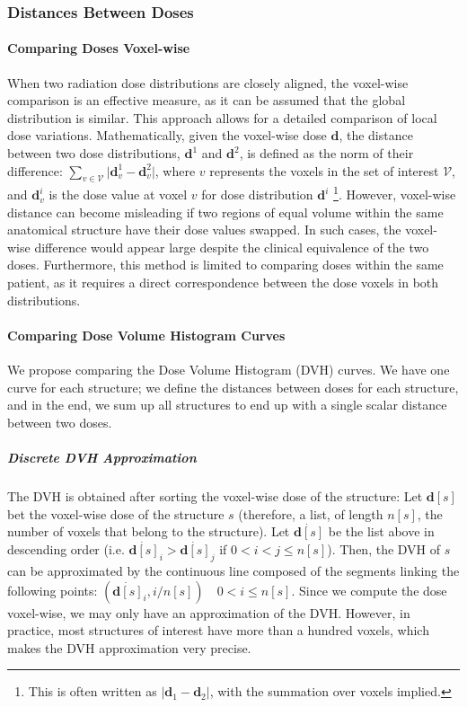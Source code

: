 \subsubsection{Distances Between Doses}
\paragraph{Comparing Doses Voxel-wise}
When two radiation dose distributions are closely aligned, the voxel-wise comparison is an effective measure, as it can be assumed that the global distribution is similar.
This approach allows for a detailed comparison of local dose variations.
Mathematically, given the voxel-wise dose $\textbf{d}$, the distance between two dose distributions, $\textbf{d}^1$ and $\textbf{d}^2$, is defined as the norm of their difference:
$\sum_{v \in \mathcal{V}} \lvert \textbf{d}^1_v - \textbf{d}^2_v \rvert$, where $v$ represents the voxels in the set of interest $\mathcal{V}$, and $\textbf{d}^i_v$ is the dose value at voxel $v$ for dose distribution $\textbf{d}^i$
\footnote{This is often written as $\lvert \textbf{d}_1 - \textbf{d}_2 \rvert$, with the summation over voxels implied.}.
However, voxel-wise distance can become misleading if two regions of equal volume within the same anatomical structure have their dose values swapped.
In such cases, the voxel-wise difference would appear large despite the clinical equivalence of the two doses.
Furthermore, this method is limited to comparing doses within the same patient, as it requires a direct correspondence between the dose voxels in both distributions.

\paragraph{Comparing Dose Volume Histogram Curves}
We propose comparing the Dose Volume Histogram (DVH) curves.
We have one curve for each structure; we define the distances between doses for each structure, and in the end, we sum up all structures to end up with a single scalar distance between two doses.

\subparagraph{Discrete DVH Approximation}
The DVH is obtained after sorting the voxel-wise dose of the structure:
Let $\textbf{d} \left[s\right]$ bet the voxel-wise dose of the structure $s$ (therefore, a list, of length $n\left[s\right]$, the number of voxels that belong to the structure).
Let $\dot{\textbf{d}\left[s\right]}$ be the list above in descending order (i.e. $\dot{\textbf{d}\left[s\right]}_i > \dot{\textbf{d}\left[s\right]}_j$ if $0 < i < j \leq n\left[s\right ]$).
Then, the DVH of $s$ can be approximated by the continuous line composed of the segments linking the following points:
$\left( \dot{\textbf{d}\left[s\right]}_i, i/n\left[s\right] \right) \quad 0 < i \leq n\left[s\right]$.
Since we compute the dose voxel-wise, we may only have an approximation of the DVH.
However, in practice, most structures of interest have more than a hundred voxels, which makes the DVH approximation very precise.


